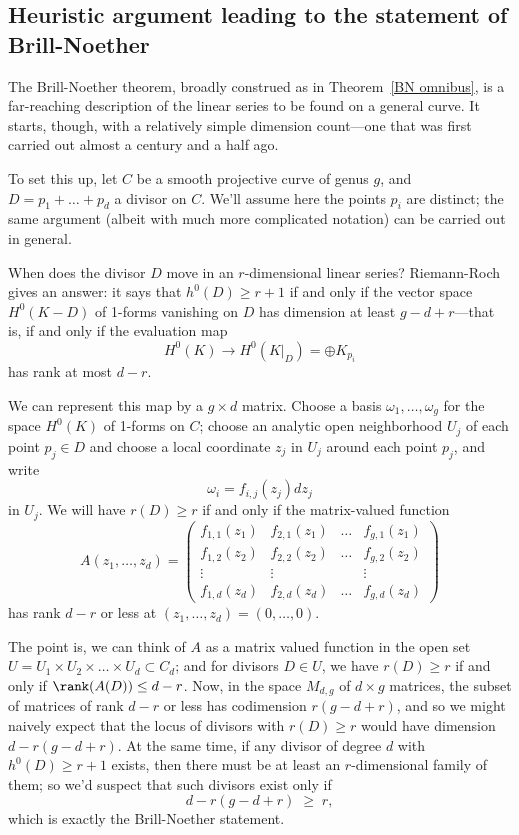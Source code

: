 \subsection{Heuristic argument leading to the statement of Brill-Noether}

The Brill-Noether theorem, broadly construed as in Theorem~\ref{BN omnibus}, is a far-reaching description of the linear series to be found on a general curve. It starts, though, with a relatively simple dimension count---one that was first carried out almost a century and a half ago.

To set this up, let $C$ be a smooth projective curve of genus $g$, and $D = p_1 + \dots + p_d$ a divisor on $C$. We'll assume here the points $p_i$ are distinct; the same argument (albeit with much more complicated notation) can be carried out in general.

When does the divisor $D$ move in an $r$-dimensional linear series? Riemann-Roch gives an answer: it says that $h^0(D) \geq r+1$ if and only if the vector space $H^0(K-D)$ of 1-forms vanishing on $D$ has dimension at least $g-d+r$---that is, if and only if the  evaluation map
$$
H^0(K) \to H^0(K|_D) = \oplus K_{p_i}
$$
has rank at most $d-r$. 

We can represent this map by a $g \times d$ matrix. Choose a basis $\omega_1,\dots,\omega_g$ for the space $H^0(K)$ of 1-forms on $C$; choose an analytic open neighborhood $U_j$ of each point $p_j \in D$ and choose a local coordinate $z_j$ in $U_j$ around each point $p_j$, and write
$$
\omega_i = f_{i,j}(z_j)dz_j
$$
in $U_j$. We will have $r(D) \geq r$ if and only if the  matrix-valued function
$$
A(z_1,\dots,z_d) = 
\begin{pmatrix}
f_{1,1}(z_1) & f_{2,1}(z_1) & \dots & f_{g,1}(z_1) \\
f_{1,2}(z_2) & f_{2,2}(z_2) & \dots & f_{g,2}(z_2) \\
\vdots & \vdots &  & \vdots \\
f_{1,d}(z_d) & f_{2,d}(z_d) & \dots & f_{g,d} (z_d)
\end{pmatrix}
$$
has rank $d-r$ or less at $(z_1,\dots,z_d) = (0,\dots,0)$.

The point is, we can think of $A$ as a matrix valued function in the open set $U = U_1 \times U_2 \times \dots \times U_d \subset C_d$; and for divisors $D \in U$, we have $r(D) \geq r$ if and only if $\rank(A(D)) \leq d-r$. Now, in the space $M_{d,g}$ of $d \times g$ matrices, the subset of matrices of rank $d-r$ or less has codimension $r(g-d+r)$, and so we might naively expect that the locus of divisors with $r(D) \geq r$ would have dimension $d - r(g-d+r)$. At the same time, if any divisor of degree $d$ with $h^0(D) \geq r+1$ exists, then there must be at least an $r$-dimensional family of them; so we'd suspect that such divisors exist only if
$$
d - r(g-d+r) \; \geq \; r,
$$
which is exactly the Brill-Noether statement.

